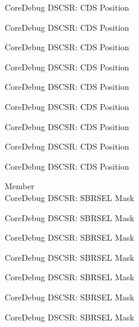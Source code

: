 \begin{DoxyRefList}
\label{deprecated__deprecated000646}%
%
Core\+Debug DSCSR\+: CDS Position 

\label{deprecated__deprecated000752}%
%
Core\+Debug DSCSR\+: CDS Position 

\label{deprecated__deprecated000806}%
%
Core\+Debug DSCSR\+: CDS Position 

\label{deprecated__deprecated000882}%
%
Core\+Debug DSCSR\+: CDS Position 

\label{deprecated__deprecated000945}%
%
Core\+Debug DSCSR\+: CDS Position 

\label{deprecated__deprecated001024}%
%
Core\+Debug DSCSR\+: CDS Position 

\label{deprecated__deprecated001100}%
%
Core\+Debug DSCSR\+: CDS Position 

\label{deprecated__deprecated001203}%
%
Core\+Debug DSCSR\+: CDS Position 

\label{deprecated__deprecated001305}%
%
Core\+Debug DSCSR\+: CDS Position  
\item[Member \doxylink{group___c_m_s_i_s___s_c_b_gaaffe28a24f05446e55ba3d75bb6f4cd0}{Core\+Debug\+\_\+\+DSCSR\+\_\+\+SBRSEL\+\_\+\+Msk} ]\hfill \\
\label{deprecated__deprecated000096}%
%
Core\+Debug DSCSR\+: SBRSEL Mask 

\label{deprecated__deprecated000150}%
%
Core\+Debug DSCSR\+: SBRSEL Mask 

\label{deprecated__deprecated000226}%
%
Core\+Debug DSCSR\+: SBRSEL Mask 

\label{deprecated__deprecated000289}%
%
Core\+Debug DSCSR\+: SBRSEL Mask 

\label{deprecated__deprecated000368}%
%
Core\+Debug DSCSR\+: SBRSEL Mask 

\label{deprecated__deprecated000444}%
%
Core\+Debug DSCSR\+: SBRSEL Mask 

\label{deprecated__deprecated000547}%
%
Core\+Debug DSCSR\+: SBRSEL Mask 


\end{DoxyRefList}
